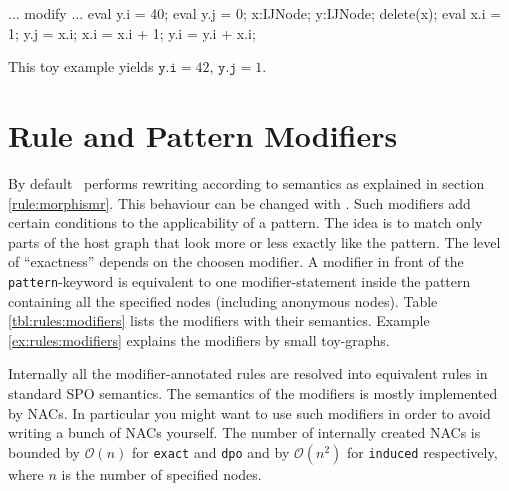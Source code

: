 \begin{example}
\begin{grgen}
...
modify {
  ...
  eval { y.i = 40; }
  eval { y.j = 0;  }
  x:IJNode;
  y:IJNode;
  delete(x);
  eval {
    x.i = 1; 
    y.j = x.i;
    x.i = x.i + 1;
    y.i = y.i + x.i;
  }
}
\end{grgen}
This toy example yields $\texttt{y.i} = 42$, $\texttt{y.j} = 1$.
\end{example}

\section{Rule and Pattern Modifiers} 
\label{sct:patternmodifier}
By default \GrG\ performs rewriting according to  semantics as explained in section \ref{rule:morphismr}.
This behaviour can be changed with .
Such modifiers add certain conditions to the applicability of a pattern.
The idea is to match only parts of the host graph that look more or less exactly like the pattern.
The level of ``exactness'' depends on the choosen modifier.
A modifier in front of the \texttt{pattern}-keyword is equivalent to one modifier-statement inside the pattern containing all the specified nodes (including anonymous nodes).
Table \ref{tbl:rules:modifiers} lists the modifiers with their semantics.
Example \ref{ex:rules:modifiers} explains the modifiers by small toy-graphs.
\begin{note}
    Internally all the modifier-annotated rules are resolved into equivalent rules in standard SPO semantics.
    The semantics of the modifiers is mostly implemented by NACs.
    In particular you might want to use such modifiers in order to avoid writing a bunch of NACs yourself.
    The number of internally created NACs is bounded by $\mathcal{O}(n)$ for \texttt{exact} and \texttt{dpo} and by $\mathcal{O}(n^2)$ for \texttt{induced} respectively, where $n$ is the number of specified nodes.
\end{note} 
